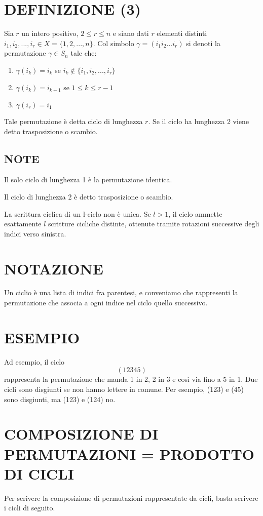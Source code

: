\section{DEFINIZIONE (3)}
Sia $r$ un intero positivo, $2 \leq r \leq n $ e siano dati $r$ elementi distinti $i_1, i_2, ..., i_r \in X=\{1,2,...,n\}$.
Col simbolo $\gamma = (i_1 i_2 ... i_r)$ si denoti la permutazione $\gamma \in S_n$ tale che:
\begin{enumerate}
 \item $\gamma (i_k) = i_k$ se $i_k \notin \{i_1, i_2, ..., i_r\}$
 \item $\gamma(i_k)=i_{k+1}$ se $1 \leq k \leq r-1$
 \item $\gamma (i_r)=i_1$
\end{enumerate}
Tale permutazione è detta ciclo di lunghezza $r$.
Se il ciclo ha lunghezza 2 viene detto trasposizione o scambio.

\subsection{NOTE}
Il solo ciclo di lunghezza 1 è la permutazione identica.

Il ciclo di lunghezza 2 è detto trasposizione o scambio.

La scrittura ciclica di un l-ciclo non è unica. Se $l>1$, il ciclo ammette esattamente $l$ scritture cicliche distinte,
ottenute tramite rotazioni successive degli indici verso sinistra.

\section{NOTAZIONE}
Un ciclio è una lista di indici fra parentesi, e conveniamo che rappresenti la permutazione che associa a ogni indice nel ciclo
quello successivo.

\section{ESEMPIO}
Ad esempio, il ciclo
\[
 (12345)
\]
rappresenta la permutazione che manda 1 in 2, 2 in 3 e così via fino a 5 in 1. Due cicli sono disgiunti se non hanno lettere in comune.
Per esempio, (123) e (45) sono disgiunti, ma (123) e (124) no. 

\section{COMPOSIZIONE DI PERMUTAZIONI = PRODOTTO DI CICLI}
Per scrivere la composizione di permutazioni rappresentate da cicli,
basta scrivere i cicli di seguito.

